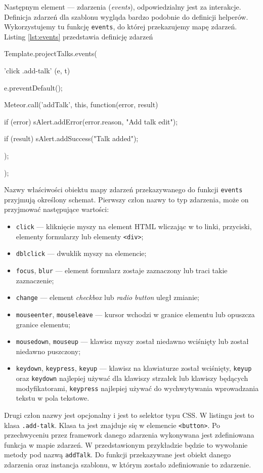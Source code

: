 Następnym element --- zdarzenia (\emph{events}), odpowiedzialny jest za interakcje. Definicja zdarzeń dla szablonu wygląda bardzo podobnie do definicji helperów. Wykorzystujemy tu funkcję \verb|events|, do której przekazujemy mapę zdarzeń. Listing \ref{lst:events} przedstawia definicję zdarzeń 
\begin{js}[caption={Definicja zdarzeń},label={lst:events}]
Template.projectTalks.events({
    'click .add-talk' (e, t) {
        e.preventDefault();
        
        Meteor.call('addTalk', this, function(error, result) {
            if (error) {
                sAlert.addError(error.reason, "Add talk edit");
            }

            if (result) {
                sAlert.addSuccess("Talk added");
            }
        });
    }
});
\end{js}
Nazwy właściwości obiektu mapy zdarzeń przekazywanego do funkcji \verb|events| przyjmują określony schemat. Pierwszy człon nazwy to typ zdarzenia, może on przyjmować następujące wartości:
\begin{itemize}
 \item \verb|click| --- kliknięcie myszy na element HTML wliczając w to linki, przyciski, elementy formularzy lub elementy \verb|<div>|;
 \item \verb|dblclick| --- dwuklik myszy na elemencie;
 \item \verb|focus|, \verb|blur| --- element formularz zostaje zaznaczony lub traci takie zaznaczenie;
 \item \verb|change| --- element \textit{checkbox} lub \textit{radio button} uległ zmianie;
 \item \verb|mouseenter|, \verb|mouseleave| --- kursor wchodzi w granice elementu lub opuszcza granice elementu;
 \item \verb|mousedown|, \verb|mouseup| --- klawisz myszy został niedawno wciśnięty lub został niedawno puszczony;
 \item \verb|keydown|, \verb|keypress|, \verb|keyup| --- klawisz na klawiaturze został wciśnięty, \verb|keyup| oraz \verb|keydown| najlepiej używać dla klawiszy strzałek lub klawiszy będących modyfikatorami, \verb|keypress| najlepiej używać do wychwytywania wprowadzania tekstu w pola tekstowe. 
\end{itemize}
Drugi człon nazwy jest opcjonalny i jest to selektor typu CSS. W listingu jest to klasa \verb|.add-talk|. Klasa ta jest znajduje się w elemencie \verb|<button>|. Po przechwyceniu przez framework danego zdarzenia wykonywana jest zdefiniowana funkcja w mapie zdarzeń. W przedstawionym przykładzie będzie to wywołanie metody pod nazwą \verb|addTalk|. Do funkcji przekazywane jest obiekt danego zdarzenia oraz instancja szablonu, w którym zostało zdefiniowanie to zdarzenie. 

